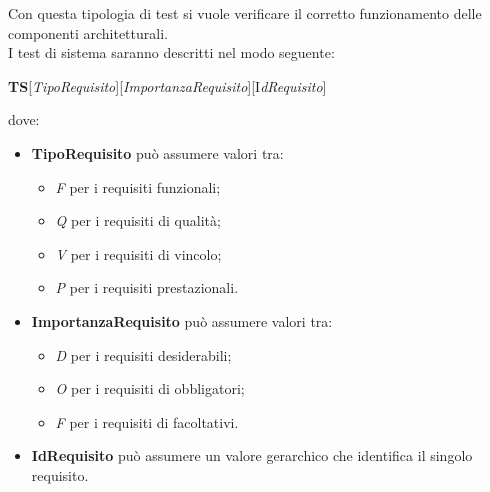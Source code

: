 Con questa tipologia di test si vuole verificare il corretto funzionamento delle componenti architetturali.\\
I test di sistema saranno descritti nel modo seguente:
\begin{center}
\textbf{TS}[\textit{TipoRequisito}][\textit{ImportanzaRequisito}][I\textit{dRequisito}]
\end{center}
dove:
\begin{itemize}
\item \textbf{TipoRequisito} può assumere valori tra:
\begin{itemize}
\item \textit{F} per i requisiti funzionali;
\item \textit{Q} per i requisiti di qualità;
\item \textit{V} per i requisiti di vincolo;
\item \textit{P} per i requisiti prestazionali.
\end{itemize}
\item \textbf{ImportanzaRequisito} può assumere valori tra:
\begin{itemize}
\item \textit{D} per i requisiti desiderabili;
\item \textit{O} per i requisiti di obbligatori;
\item \textit{F} per i requisiti di facoltativi.
\end{itemize}
\item \textbf{IdRequisito} può assumere un valore gerarchico che identifica il singolo requisito.
\end{itemize}
